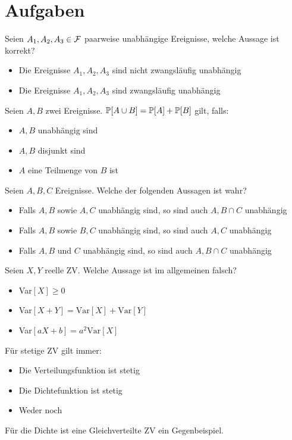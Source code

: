 \section{Aufgaben}



Seien $A_1, A_2, A_3 \in \mathcal{F}$ paarweise unabhängige Ereignisse, welche Aussage ist korrekt?
\begin{itemize}
	\item[\marked] Die Ereignisse $A_1, A_2, A_3$ sind nicht zwangsläufig unabhängig
	\item[$\square$] Die Ereignisse $A_1, A_2, A_3$ sind zwangsläufig unabhängig
\end{itemize}

\hrulefill

Seien $A, B$ zwei Ereignisse. $\mathbb{P}[A \cup B] = \mathbb{P}[A] + \mathbb{P}[B]$ gilt, falls:
\begin{itemize}
	\item[$\square$] $A, B$ unabhängig sind
	\item[\marked] $A, B$ disjunkt sind
	\item[$\square$] $A$ eine Teilmenge von $B$ ist
\end{itemize}

\hrulefill

Seien $A, B, C$ Ereignisse. Welche der folgenden Aussagen ist wahr?
\begin{itemize}
	\item[$\square$] Falls $A, B$ sowie $A, C$ unabhängig sind, so sind auch $A, B \cap C$ unabhängig
	\item[$\square$] Falls $A, B$ sowie $B, C$ unabhängig sind, so sind auch $A, C$ unabhängig
	\item[\marked] Falls $A, B$ und $C$ unabhängig sind, so sind auch $A, B \cap C$ unabhängig
\end{itemize}

\hrulefill

Seien $X,Y$ reelle ZV. Welche Aussage ist im allgemeinen falsch?
\begin{itemize}
	\item[$\square$] Var$[X] \geq 0$
	\item[\marked] Var$[X + Y] = \text{Var}[X] + \text{Var}[Y]$
	\item[$\square$] Var$[aX + b] = a^2 \text{Var}[X]$
\end{itemize}

\hrulefill

Für stetige ZV gilt immer:
\begin{itemize}
	\item[\marked] Die Verteilungsfunktion ist stetig
	\item[$\square$] Die Dichtefunktion ist stetig
	\item[$\square$] Weder noch
\end{itemize}
Für die Dichte ist eine Gleichverteilte ZV ein Gegenbeispiel.

